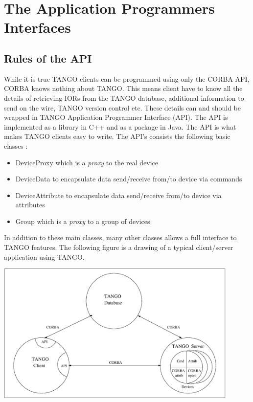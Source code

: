 \section{The Application Programmers Interfaces}

\subsection{Rules of the API}

While it is true TANGO clients can be programmed using only the CORBA
API, CORBA knows nothing about TANGO. This means client have to know
all the details of retrieving IORs from the TANGO database, additional
information to send on the wire, TANGO version control etc. These
details can and should be wrapped in TANGO Application Programmer
Interface (API). The API is implemented as a library in C++ and as
a package in Java. The API is what makes TANGO clients easy to write.
The API's consists the following basic classes :
\begin{itemize}
\item DeviceProxy which is a \emph{proxy} to the real device
\item DeviceData to encapsulate data send/receive from/to device via commands
\item DeviceAttribute to encapsulate data send/receive from/to device via
attributes
\item Group which is a \emph{proxy} to a group of devices
\end{itemize}
In addition to these main classes, many other classes allows a full
interface to TANGO features. The following figure is a drawing of
a typical client/server application using TANGO.

\vspace{0.3cm}

\begin{center}
\includegraphics[width=12cm,height=7cm]{ds_model/archi}
\par\end{center}

